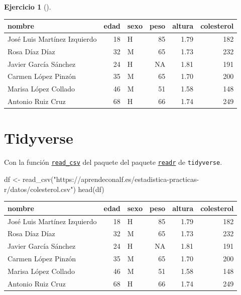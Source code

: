 \documentclass[
  a4paper,
]{scrreport}
\newenvironment{Shaded}{\begin{snugshade}}{\end{snugshade}}
\newcommand{\FunctionTok}[1]{\textcolor[rgb]{0.28,0.35,0.67}{#1}}
\newcommand{\NormalTok}[1]{\textcolor[rgb]{0.00,0.23,0.31}{#1}}
\newcommand{\OtherTok}[1]{\textcolor[rgb]{0.00,0.23,0.31}{#1}}
\newcommand{\StringTok}[1]{\textcolor[rgb]{0.13,0.47,0.30}{#1}}
\theoremstyle{definition}
\newtheorem{exercise}{Ejercicio}[chapter]
\theoremstyle{remark}
\begin{document}
\begin{exercise}[]
\begin{enumerate}
\begin{tcolorbox}
  \begin{longtable}[]{@{}lrlrrr@{}}
  \toprule\noalign{}
  nombre & edad & sexo & peso & altura & colesterol \\
  \midrule\noalign{}
  \endhead
  \bottomrule\noalign{}
  \endlastfoot
  José Luis Martínez Izquierdo & 18 & H & 85 & 1.79 & 182 \\
  Rosa Díaz Díaz & 32 & M & 65 & 1.73 & 232 \\
  Javier García Sánchez & 24 & H & NA & 1.81 & 191 \\
  Carmen López Pinzón & 35 & M & 65 & 1.70 & 200 \\
  Marisa López Collado & 46 & M & 51 & 1.58 & 148 \\
  Antonio Ruiz Cruz & 68 & H & 66 & 1.74 & 249 \\
  \end{longtable}

  \section{Tidyverse}

  Con la función
  \href{https://readr.tidyverse.org/reference/read_delim.html}{\texttt{read\_csv}}
  del paquete del paquete
  \href{https://readr.tidyverse.org/index.html}{\texttt{readr}} de
  \texttt{tidyverse}.

\begin{Shaded}
\begin{Highlighting}[]
\NormalTok{df }\OtherTok{\textless{}{-}} \FunctionTok{read\_csv}\NormalTok{(}\StringTok{"https://aprendeconalf.es/estadistica{-}practicas{-}r/datos/colesterol.csv"}\NormalTok{)}
\FunctionTok{head}\NormalTok{(df)}
\end{Highlighting}
\end{Shaded}

  \begin{longtable}[]{@{}lrlrrr@{}}
  \toprule\noalign{}
  nombre & edad & sexo & peso & altura & colesterol \\
  \midrule\noalign{}
  \endhead
  \bottomrule\noalign{}
  \endlastfoot
  José Luis Martínez Izquierdo & 18 & H & 85 & 1.79 & 182 \\
  Rosa Díaz Díaz & 32 & M & 65 & 1.73 & 232 \\
  Javier García Sánchez & 24 & H & NA & 1.81 & 191 \\
  Carmen López Pinzón & 35 & M & 65 & 1.70 & 200 \\
  Marisa López Collado & 46 & M & 51 & 1.58 & 148 \\
  Antonio Ruiz Cruz & 68 & H & 66 & 1.74 & 249 \\
  \end{longtable}


\end{tcolorbox}
\end{enumerate}
\end{exercise}
\end{document}
